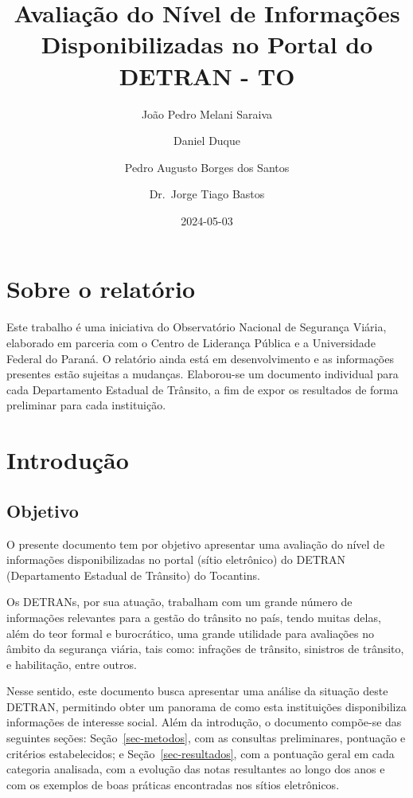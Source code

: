 \documentclass[
  a4paper,
]{article}
\title{Avaliação do Nível de Informações Disponibilizadas no Portal do
DETRAN - TO}
\author[1]{João Pedro Melani Saraiva}
\author[2]{Daniel Duque}
\author[1]{Pedro Augusto Borges dos Santos}
\author[3]{Dr.~Jorge Tiago Bastos}
\affil[1]{Observatório Nacional de Segurança Viária}
\affil[2]{Centro de Liderança Pública}
\affil[3]{Universidade Federal do Paraná}
\date{2024-05-03}
\begin{document}
\maketitle

\section{Sobre o relatório}\label{sobre-o-relatuxf3rio}

Este trabalho é uma iniciativa do Observatório Nacional de Segurança
Viária, elaborado em parceria com o Centro de Liderança Pública e a
Universidade Federal do Paraná. O relatório ainda está em
desenvolvimento e as informações presentes estão sujeitas a mudanças.
Elaborou-se um documento individual para cada Departamento Estadual de
Trânsito, a fim de expor os resultados de forma preliminar para cada
instituição.

\section{Introdução}\label{introduuxe7uxe3o}

\subsection{Objetivo}\label{objetivo}

O presente documento tem por objetivo apresentar uma avaliação do nível
de informações disponibilizadas no portal (sítio eletrônico) do DETRAN
(Departamento Estadual de Trânsito) do Tocantins.

Os DETRANs, por sua atuação, trabalham com um grande número de
informações relevantes para a gestão do trânsito no país, tendo muitas
delas, além do teor formal e burocrático, uma grande utilidade para
avaliações no âmbito da segurança viária, tais como: infrações de
trânsito, sinistros de trânsito, e habilitação, entre outros.

Nesse sentido, este documento busca apresentar uma análise da situação
deste DETRAN, permitindo obter um panorama de como esta instituições
disponibiliza informações de interesse social. Além da introdução, o
documento compõe-se das seguintes seções: Seção~\ref{sec-metodos}, com
as consultas preliminares, pontuação e critérios estabelecidos; e
Seção~\ref{sec-resultados}, com a pontuação geral em cada categoria
analisada, com a evolução das notas resultantes ao longo dos anos e com
os exemplos de boas práticas encontradas nos sítios eletrônicos.
\end{document}
